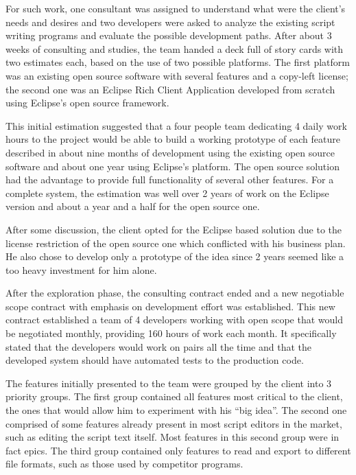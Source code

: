 \documentclass[lnbip]{svmultln}
\begin{document}
For such work, one consultant was assigned to understand what were the
client's needs and desires and two developers were asked to analyze
the existing script writing programs and evaluate the possible
development paths. After about 3 weeks of consulting and studies, the
team handed a deck full of story cards with two estimates each, based
on the use of two possible platforms. The first platform was an
existing open source software with several features and a copy-left
license; the second one was an Eclipse Rich Client Application
developed from scratch using Eclipse's open source framework.

This initial estimation suggested that a four people team dedicating 4 daily
work hours to the project would be able to build a working prototype of each
feature described in about nine months of development using the existing open
source software and about one year using Eclipse's platform. The open source
solution had the advantage to provide full functionality of several other
features. For a complete system, the estimation was well over 2 years of work on
the Eclipse version and about a year and a half for the open source one.

After some discussion, the client opted for the Eclipse based solution
due to the license restriction of the open source one which conflicted
with his business plan. He also chose to develop only a prototype of
the idea since 2 years seemed like a too heavy investment for him
alone.

After the exploration phase, the consulting contract ended and a new negotiable
scope contract\cite{tem citação pra esse tipo de contrato?} with emphasis on
development effort was established. This new contract established a team of 4
developers working with open scope that would be negotiated monthly, providing
160 hours of work each month. It specifically stated that the developers would
work on pairs all the time and that the developed system should have automated
tests to the production code.


The features initially presented to the team were grouped by the client into 3
priority groups. The first group contained all features most critical to the
client, the ones that would allow him to experiment with his ``big idea''. The
second one comprised of some features already present in most script editors in
the market, such as editing the script text itself. Most features in this second
group were in fact epics. The third group contained only features to read and
export to different file formats, such as those used by competitor programs.
\end{document}
